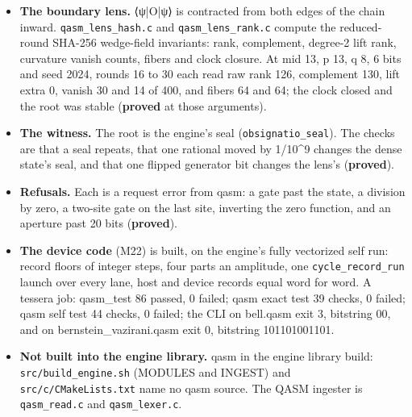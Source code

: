 \begin{itemize}
\begin{itemize}
\item Delta-Bell: bond [2]; ⟨00⟩ = “1/2sqrt2”, ⟨11⟩ = “(1/2sqrt2)w”, ⟨ψ|ψ⟩ = 1.
\item ⟨X0X1⟩ = “(1/2 + (1/2)w\textasciicircum{}2) / (w)”, ⟨Z0Z1⟩ = 1, ⟨X0⟩ = 0.
\item Delta-GHZ3: bonds [2,2], and ⟨X0X1X2⟩ is the same function.
\item |+++⟩ with a phase on wire 0 keeps bonds [1,1].
\item At ω = e\textasciicircum{}\{iπ/4\}, ⟨X0X1⟩ equals the numeric controlled-T reading, “1/2sqrt2”, and the norm is exactly 1.
\end{itemize}
\item \textbf{The boundary lens.} ⟨ψ|O|ψ⟩ is contracted from both edges of the chain inward. \texttt{qasm\_\allowbreak{}lens\_\allowbreak{}hash.\allowbreak{}c} and \texttt{qasm\_\allowbreak{}lens\_\allowbreak{}rank.\allowbreak{}c} compute the reduced-round SHA-256 wedge-field invariants: rank, complement, degree-2 lift rank, curvature vanish counts, fibers and clock closure. At mid 13, p 13, q 8, 6 bits and seed 2024, rounds 16 to 30 each read raw rank 126, complement 130, lift extra 0, vanish 30 and 14 of 400, and fibers 64 and 64; the clock closed and the root was stable (\textbf{proved} at those arguments).
\item \textbf{The witness.} The root is the engine's seal (\texttt{obsignatio\_\allowbreak{}seal}). The checks are that a seal repeats, that one rational moved by 1/10\textasciicircum{}9 changes the dense state's seal, and that one flipped generator bit changes the lens's (\textbf{proved}).
\item \textbf{Refusals.} Each is a request error from qasm: a gate past the state, a division by zero, a two-site gate on the last site, inverting the zero function, and an aperture past 20 bits (\textbf{proved}).
\item \textbf{The device code} (M22) is built, on the engine's fully vectorized self run: record floors of integer steps, four parts an amplitude, one \texttt{cycle\_\allowbreak{}record\_\allowbreak{}run} launch over every lane, host and device records equal word for word. A tessera job: qasm\_\allowbreak{}test 86 passed, 0 failed; qasm exact test 39 checks, 0 failed; qasm self test 44 checks, 0 failed; the CLI on bell.qasm exit 3, bitstring 00, and on bernstein\_\allowbreak{}vazirani.qasm exit 0, bitstring 101101001101.
\item \textbf{Not built into the engine library.} qasm in the engine library build: \texttt{src/\allowbreak{}build\_\allowbreak{}engine.\allowbreak{}sh} (MODULES and INGEST) and \texttt{src/\allowbreak{}c/\allowbreak{}CMake\allowbreak{}Lists.\allowbreak{}txt} name no qasm source. The QASM ingester is \texttt{qasm\_\allowbreak{}read.\allowbreak{}c} and \texttt{qasm\_\allowbreak{}lexer.\allowbreak{}c}.
\end{itemize}


